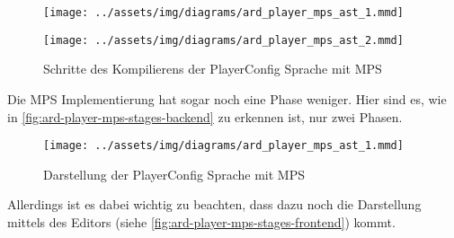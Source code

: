 \begin{figure}[H]
    \begin{framed}
        \texttt{[image: ../assets/img/diagrams/ard\_player\_mps\_ast\_1.mmd]}
    \end{framed}
    \begin{framed}
        \texttt{[image: ../assets/img/diagrams/ard\_player\_mps\_ast\_2.mmd]}
    \end{framed}
    \begin{framed}
        
    \end{framed}
    \caption{Schritte des Kompilierens der PlayerConfig Sprache mit \acs{MPS}}
    \label{fig:ard-player-mps-stages-backend}
\end{figure}
Die \ac{MPS} Implementierung hat sogar noch eine Phase weniger.
Hier sind es, wie in \autoref{fig:ard-player-mps-stages-backend} zu erkennen ist, nur zwei Phasen.

\begin{figure}[H]
    \begin{framed}
        
    \end{framed}
    \begin{framed}
        \texttt{[image: ../assets/img/diagrams/ard\_player\_mps\_ast\_1.mmd]}
    \end{framed}
    \caption{Darstellung der PlayerConfig Sprache mit \acs{MPS}}
    \label{fig:ard-player-mps-stages-frontend}
\end{figure}
Allerdings ist es dabei wichtig zu beachten, dass dazu noch die Darstellung mittels des Editors (siehe \autoref{fig:ard-player-mps-stages-frontend}) kommt.

